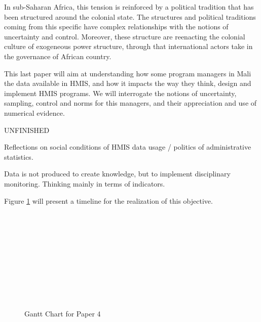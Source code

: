 In sub-Saharan Africa, this tension is reinforced by a political tradition that has been structured around the colonial state. The structures and political traditions coming from this specific have complex relationships with the notions of uncertainty and control. Moreover, these structure are reenacting the colonial culture of exogeneous power structure, through that international actors take in the governance of African country.

This last paper will aim at understanding how some program managers in Mali the data available in HMIS, and how it impacts the way they think, design and implement HMIS programs. We will interrogate the notions of uncertainty, sampling, control and norms for this managers, and their appreciation and use of numerical evidence.

UNFINISHED

Reflections on social conditions of HMIS data usage  / politics of administrative statistics.

Data is not produced to create knowledge, but to implement disciplinary monitoring. Thinking mainly in terms of indicators.


Figure \ref{Gantt4} will present a timeline for the realization of this objective.

\begin{figure}[h]
	\begin{ganttchart}{1}{24}
		 \\
		 \\
		 \\
		 \\
		 \\
		 \\
		 \\
		 \\
		 \\
	\end{ganttchart}
	\caption{Gantt Chart for Paper 4}
	\label{Gantt4}
\end{figure}
